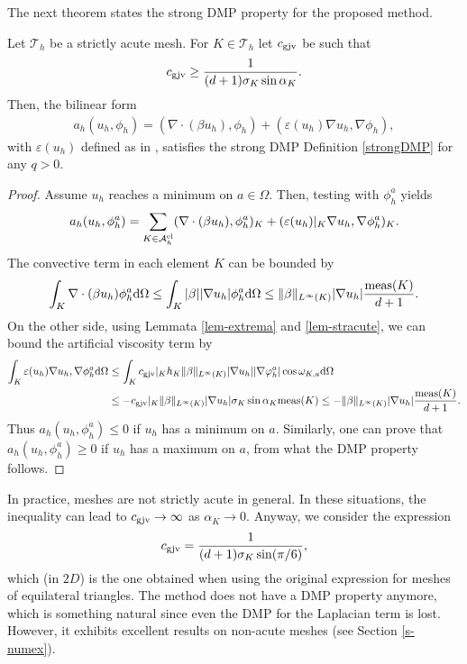 The next theorem states the strong DMP property for the proposed method.
\begin{theorem}
Let $\mathcal{T}_h$ be a strictly acute mesh. For $K\in \mathcal{T}_h$ let $c_{\rm gjv}$ be such that 
\begin{align}\label{eq-cgjv1}
c_{\rm gjv} \geq \frac{1}{(d+1) \sigma_K \sin \alpha_K}.
\end{align}
Then, the bilinear form
\begin{align}\label{eq-bfgjv}
a_h(u_h,\phi_h) = (\nabla \cdot ( \beta u_h), \phi_h) + (\varepsilon(u_h) \nabla u_h, \nabla \phi_h), 
\end{align}
with $\varepsilon(u_h)$ defined as in , satisfies  the strong DMP Definition \ref{strongDMP}  for any $q>0$.
\end{theorem}
\begin{proof}
Assume $u_h$ reaches a minimum on $a\in\Omega$. Then, testing  with $\phi_h^a$ yields
\begin{align*}
 a_h(u_h,\phi_h^a) = \sum\limits_{K\in\mathcal{A}^{\rm el}_h} (\nabla \cdot  (\beta u_h), \phi_h^a)_K + 
 (\varepsilon(u_h)|_K \nabla u_h, \nabla \phi_h^a)_K.
\end{align*}
The convective term in each element $K$ can be bounded by
\begin{align*}
\int_K \nabla \cdot (\beta  u_h) \phi_h^a {\rm d}\Omega \leq \int_K |\beta| |\nabla u_h| \phi_h^a {\rm d}\Omega \leq \|\beta\|_{L^\infty(K)} |\nabla u_h| \frac{{\rm meas}(K)}{d+1}.
\end{align*}
On the other side, using Lemmata \ref{lem-extrema} and \ref{lem-stracute}, we can bound the artificial viscosity term by
\begin{align*}
\int_K \varepsilon(u_h) \nabla u_h, \nabla \phi^a_h {\rm d}\Omega &  \leq \int_K c_{\rm gjv}|_K h_K \|\beta\|_{L^\infty(K)} |\nabla u_h| |\nabla \varphi_h^a| \cos \omega_{K,a}{\rm d}\Omega\\
&  \leq - c_{\rm gjv}|_K \|\beta\|_{L^\infty(K)} |\nabla u_h| \sigma_K \sin \alpha_K  {\rm meas}(K) \leq - \|\beta\|_{L^\infty(K)} |\nabla u_h| \frac{{\rm meas}(K)}{d+1}.
\end{align*}
Thus $a_h(u_h,\phi_h^a) \leq 0$ if $u_h$ has a minimum on $a$. Similarly, one can prove that $a_h(u_h,\phi_h^a) \geq 0$ if $u_h$ has a maximum on $a$, from what the DMP property follows.
\end{proof}


In practice, meshes are not strictly acute in general. In these situations, the inequality  can lead to $c_{\rm gjv} \to \infty$ as $\alpha_K \to 0$. Anyway, we consider the expression 
\begin{align*}%
c_{\rm gjv} = \frac{1}{(d+1) \sigma_K \sin (\pi/6)},
\end{align*}
which (in $2D$) is the one obtained when using the original expression for meshes of equilateral triangles. The method does not have a DMP property anymore, which is something natural since even the DMP for the Laplacian term is lost. However, it exhibits excellent results on non-acute meshes (see Section \ref{s-numex}).

